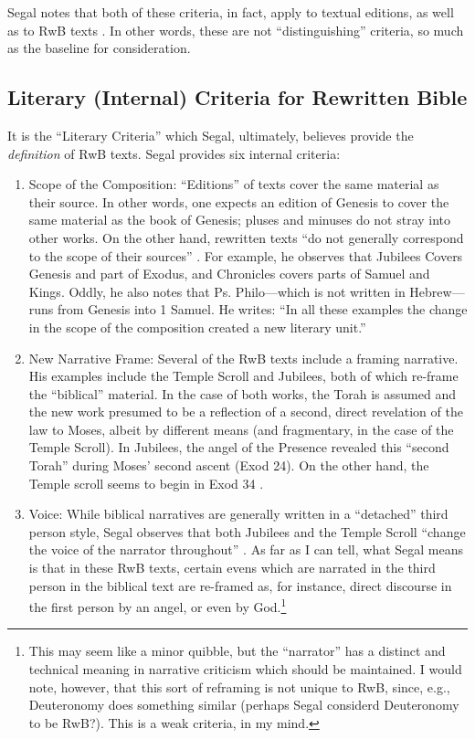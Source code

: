 Segal notes that both of these criteria, in fact, apply to textual
editions, as well as to RwB texts \autocite[20]{segal_henze2005}. In
other words, these are not ``distinguishing'' criteria, so much as the
baseline for consideration.

\subsection{Literary (Internal) Criteria for Rewritten
Bible}\label{literary-internal-criteria-for-rewritten-bible}

It is the ``Literary Criteria'' which Segal, ultimately, believes
provide the \emph{definition} of RwB
texts.\autocite[20]{segal_henze2005} Segal provides six internal
criteria:

\begin{enumerate}
\def\labelenumi{\arabic{enumi}.}
\item
  Scope of the Composition: ``Editions'' of texts cover the same
  material as their source. In other words, one expects an edition of
  Genesis to cover the same material as the book of Genesis; pluses and
  minuses do not stray into other works. On the other hand, rewritten
  texts ``do not generally correspond to the scope of their sources''
  \autocite[20]{segal_henze2005}. For example, he observes that Jubilees
  Covers Genesis and part of Exodus, and Chronicles covers parts of
  Samuel and Kings. Oddly, he also notes that Ps. Philo---which is not
  written in Hebrew---runs from Genesis into 1 Samuel. He writes: ``In
  all these examples the change in the scope of the composition created
  a new literary unit.'' \autocite[20--21]{segal_henze2005}
\item
  New Narrative Frame: Several of the RwB texts include a framing
  narrative. His examples include the Temple Scroll and Jubilees, both
  of which re-frame the ``biblical'' material. In the case of both
  works, the Torah is assumed and the new work presumed to be a
  reflection of a second, direct revelation of the law to Moses, albeit
  by different means (and fragmentary, in the case of the Temple
  Scroll). In Jubilees, the angel of the Presence revealed this ``second
  Torah'' during Moses' second ascent (Exod 24). On the other hand, the
  Temple scroll seems to begin in Exod 34
  \autocite[22]{segal_henze2005}.
\item
  Voice: While biblical narratives are generally written in a
  ``detached'' third person style, Segal observes that both Jubilees and
  the Temple Scroll ``change the voice of the narrator throughout''
  \autocite[22]{segal_henze2005}. As far as I can tell, what Segal means
  is that in these RwB texts, certain evens which are narrated in the
  third person in the biblical text are re-framed as, for instance,
  direct discourse in the first person by an angel, or even by
  God.\footnote{This may seem like a minor quibble, but the ``narrator''
    has a distinct and technical meaning in narrative criticism which
    should be maintained. I would note, however, that this sort of
    reframing is not unique to RwB, since, e.g., Deuteronomy does
    something similar (perhaps Segal considerd Deuteronomy to be RwB?).
    This is a weak criteria, in my mind.}
\end{enumerate}

